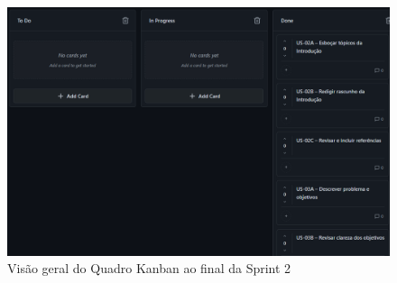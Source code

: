 \begin{figure}[htbp]
  \centering
  \includegraphics[width=0.8\linewidth]{pictures/kanban_sprint2_final.png}
  \caption{Visão geral do Quadro Kanban ao final da Sprint 2}
\end{figure}

